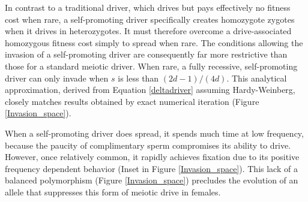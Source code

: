 \documentclass[12pt,letterpaper]{article}
\begin{document}
In contrast to a traditional driver, which drives but pays effectively
	no fitness cost when rare, 
	a self-promoting driver specifically creates homozygote
        zygotes when it drives in heterozygotes. 
It must therefore overcome a drive-associated homozygous fitness cost simply to spread when rare. 
The conditions allowing the invasion of a self-promoting driver
 	are consequently far more restrictive than those for a standard meiotic driver.
When rare, a fully recessive, self-promoting driver can only invade when $s$ 
	is less than $(2 d - 1)/(4 d)$. 
This analytical approximation, derived from Equation \eqref{deltadriver} assuming Hardy-Weinberg, 
	closely matches results obtained by exact numerical iteration (Figure \ref{Invasion_space}). 


When a self-promoting driver does spread, 
	it spends much time at low frequency, 
	because the paucity of complimentary sperm compromises its ability to drive. 
However, once relatively common, it  rapidly achieves fixation due to its
	positive frequency dependent behavior (Inset in Figure \ref{Invasion_space}).  
This lack of a balanced polymorphism (Figure \ref{Invasion_space}) precludes the evolution of an
	allele that suppresses this form of meiotic drive in females.
\end{document}
